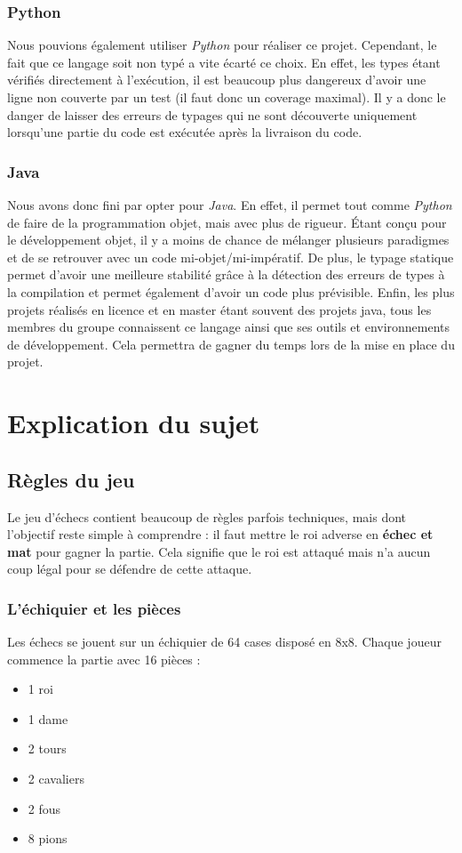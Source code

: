 \documentclass{article}
\begin{document}
\subsubsection{Python}
Nous pouvions également utiliser \textit{Python} pour réaliser ce projet. Cependant, le fait que ce langage
soit non typé a vite écarté ce choix. En effet, les types étant vérifiés directement à l'exécution, il est
beaucoup plus dangereux d'avoir une ligne non couverte par un test (il faut donc un coverage maximal). Il y
a donc le danger de laisser des erreurs de typages qui ne sont découverte uniquement lorsqu’une partie du code
est exécutée après la livraison du code.

\subsubsection{Java}
Nous avons donc fini par opter pour \textit{Java}. En effet, il permet tout comme \textit{Python} de faire
de la programmation objet, mais avec plus de rigueur. Étant conçu pour le développement objet, il y a moins
de chance de mélanger plusieurs paradigmes et de se retrouver avec un code mi-objet/mi-impératif. De plus,
le typage statique permet d'avoir une meilleure stabilité grâce à la détection des erreurs de types à la 
compilation et permet également d'avoir un code plus prévisible. Enfin, les plus projets réalisés en licence
et en master étant souvent des projets java, tous les membres du groupe connaissent ce langage ainsi que ses
outils et environnements de développement. Cela permettra de gagner du temps lors de la mise en place du projet. 

\section{Explication du sujet}
\subsection{Règles du jeu}
Le jeu d’échecs contient beaucoup de règles parfois techniques, mais dont l’objectif reste simple à comprendre :
 il faut mettre le roi adverse en \textbf{échec et mat} pour gagner la partie. Cela signifie que le roi est attaqué 
 mais n’a aucun coup légal pour se défendre de cette attaque.

\subsubsection{L'échiquier et les pièces}
Les échecs se jouent sur un échiquier de 64 cases disposé en 8x8. Chaque joueur commence la partie avec 16 pièces :
\begin{itemize}
    \item 1 roi
    \item 1 dame
    \item 2 tours
    \item 2 cavaliers
    \item 2 fous
    \item 8 pions
\end{itemize}
\end{document}
